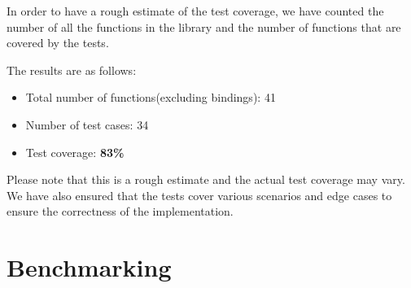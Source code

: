 \documentclass[review]{AIM_report}
\begin{document}
In order to have a rough estimate of the test coverage, we have counted the number of all the functions in the library and the number of functions that are covered by the tests.

The results are as follows:
\begin{itemize}
    \item Total number of functions(excluding bindings): 41
    \item Number of test cases: 34
    \item Test coverage: \textbf{83\%}
\end{itemize}

Please note that this is a rough estimate and the actual test coverage may vary. We have also ensured that the tests cover various scenarios and edge cases to ensure the correctness of the implementation.

\newpage
\section{Benchmarking}
\newpage
\pagestyle{empty}



\newpage
\pagestyle{empty}



\newpage
\pagestyle{empty}


\end{document}

